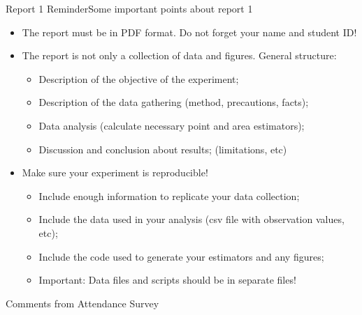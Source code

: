 \begin{frame}{Report 1 Reminder}{Some important points about report 1}
  \begin{itemize}
    \item The report must be in PDF format. Do not forget your name and student ID!\medskip

    \item The report is not only a collection of data and figures. General structure:
    \begin{itemize}
      \item Description of the objective of the experiment;
      \item Description of the data gathering (method, precautions, facts);
      \item Data analysis (calculate necessary point and area estimators);
      \item Discussion and conclusion about results; (limitations, etc)
    \end{itemize}\medskip

    \item Make sure your experiment is reproducible!
    \begin{itemize}
      \item Include enough information to replicate your data collection;
      \item Include the data used in your analysis (csv file with observation values, etc);
      \item Include the code used to generate your estimators and any figures;
      \item \alert{Important:} Data files and scripts should be in separate files!
    \end{itemize}
  \end{itemize}
\end{frame}

\begin{frame}{Comments from Attendance Survey}

\end{frame}

